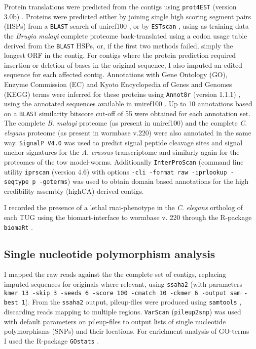 Protein translations were predicted from the contigs using
\texttt{prot4EST} (version 3.0b)
\cite{wasmuth_prot4est:_2004}. Proteins were predicted either by
joining single high scoring segment pairs (HSPs) from a \texttt{BLAST}
search of uniref100 \cite{pmid18836194}, or by \texttt{ESTscan}
\cite{estscan}, using as training data the \textit{Brugia malayi}
complete proteome back-translated using a codon usage table derived
from the \texttt{BLAST} HSPs, or, if the first two methods failed,
simply the longest ORF in the contig. For contigs where the protein
prediction required insertion or deletion of bases in the original
sequence, I also imputed an edited sequence for each affected
contig. Annotations with Gene Ontology (GO), Enzyme Commission (EC)
and Kyoto Encyclopedia of Genes and Genomes (KEGG) terms were inferred
for these proteins using \texttt{Annot8r} (version 1.1.1)
\cite{schmid_annot8r:_2008}, using the annotated sequences available
in uniref100 \cite{pmid18836194}. Up to 10 annotations based on a
\texttt{BLAST} similarity bitscore cut-off of 55 were obtained for
each annotation set. The complete \textit{B. malayi} proteome (as
present in uniref100) and the complete \textit{C. elegans} proteome
(as present in wormbase v.220) were also annotated in the same
way. \texttt{SignalP V4.0} \cite{pmid21959131} was used to predict
signal peptide cleavage sites and signal anchor signatures for the
\textit{A. crassus}-transcriptome and similarly again for the
proteomes of the tow model-worms.  Additionally \texttt{InterProScan}
\cite{pmid11590104} (command line utility \texttt{iprscan} (version
4.6) with options \texttt{-cli -format raw -iprlookup -seqtype p
  -goterms}) was used to obtain domain based annotations for the high
credibility assembly (highCA) derived contigs.

I recorded the presence of a lethal rnai-phenotype in the
\textit{C. elegans} ortholog of each TUG using the biomart-interface
\cite{pmid22083790} to wormbase v. 220 through the R-package
\texttt{biomaRt} \cite{pmid19617889}.

\subsection{Single nucleotide polymorphism analysis}

I mapped the raw reads against the the complete set of contigs,
replacing imputed sequences for originals where relevant, using
\texttt{ssaha2} \cite{pmid11591649} (with parameters \texttt{-kmer 13
  -skip 3 -seeds 6 -score 100 -cmatch 10 -ckmer 6 -output sam -best
  1}). From the \texttt{ssaha2} output, pileup-files were produced
using \texttt{samtools} \cite{journals/bioinformatics/LiHWFRHMAD09},
discarding reads mapping to multiple regions. \texttt{VarScan}
\cite{pmid19542151} (\texttt{pileup2snp}) was used with default
parameters on pileup-files to output lists of single nucleotide
polymorphisms (SNPs) and their locations. For enrichment analysis of
GO-terms I used the R-package \texttt{GOstats} \cite{pmid17098774}.

